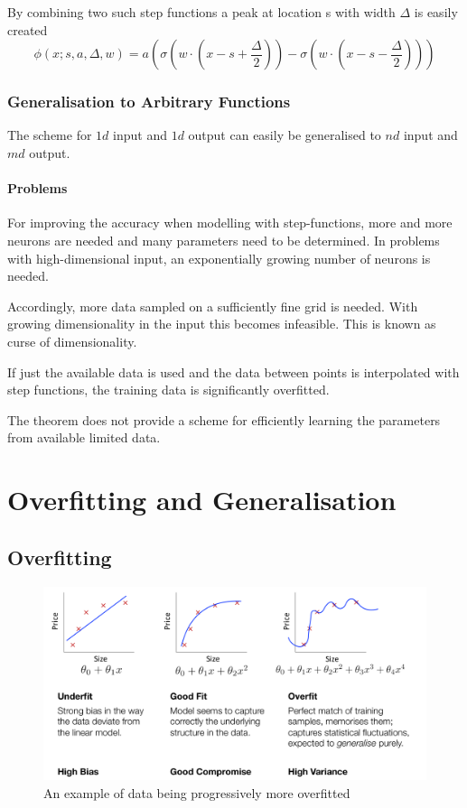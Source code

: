 \documentclass[11pt]{article}
\begin{document}
By combining two such step functions a peak at location s with width $\Delta$ is easily created
\begin{equation*}
	\phi(x;s,a,\Delta,w) = a\left(\sigma(w\cdot(x-s+\frac{\Delta}{2})) - \sigma(w\cdot(x-s-\frac{\Delta}{2}))\right)
\end{equation*}

\subsubsection{Generalisation to Arbitrary Functions}

The scheme for $1d$ input and $1d$ output can easily be generalised to $nd$ input and $md$ output.

\paragraph{Problems} For improving the accuracy when modelling with step-functions, more and more neurons are needed and many parameters need to be determined. In problems with high-dimensional input, an exponentially growing number of neurons is needed.

Accordingly, more data sampled on a sufficiently fine grid is needed. With growing dimensionality in the input  this becomes infeasible. This is known as curse of dimensionality.

If just the available data is used and the data between points is interpolated with step functions, the training data is significantly overfitted.

The theorem does not provide a scheme for efficiently learning the parameters from available limited data.

\section{Overfitting and Generalisation}

\subsection{Overfitting}
\begin{figure}[tbh]
	\centering
	\includegraphics[width=\linewidth,keepaspectratio]{img/data_overfitting_example}
	\caption{An example of data being progressively more overfitted}
	\label{fig:dataoverfittingexample}
\end{figure}
\end{document}
